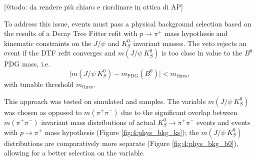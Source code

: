 [@todo: da rendere più chiaro e riordinare in ottica di AP]

To address this issue, events must pass a physical background selection based on the results of a Decay Tree Fitter refit with $p\rightarrow \pi^+$ mass hypothesis and kinematic constraints on the $J/\psi$ and $K_S^0$ invariant masses.
The veto rejects an event if the DTF refit converges and $m(J/\psi~K_S^0)$ is too close in value to the $B^0$ PDG mass, i.e.
\begin{equation}
	\lvert
	m(J/\psi~K_S^0) - m_\text{PDG}(B^0)
	\rvert < m_\text{thres},
\end{equation}
with tunable threshold $m_\text{thres}$.

This approach was tested on simulated \demonstratorshort and \physbkgshort samples.
The variable $m(J/\psi~K_S^0)$ was chosen as opposed to $m(\pi^+\pi^-)$ due to the significant overlap between $m(\pi^+\pi^-)$ invariant mass distributions of actual $K_S^0 \rightarrow \pi^+ \pi^-$ events and \lambdadecay events with $p\rightarrow \pi^+$ mass hypothesis (Figure \ref{fig:4:phys_bkg_ks});
the $m(J/\psi~K_S^0)$ distributions are comparatively more separate (Figure \ref{fig:4:phys_bkg_b0}), allowing for a better selection on the variable.

